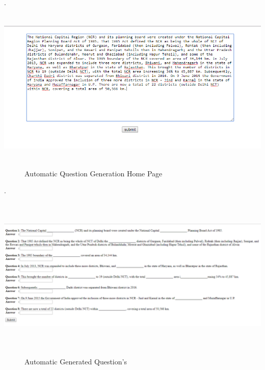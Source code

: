 \break
. \\[2.0cm]
\begin{center}
	\includegraphics[width=13.5cm, height=7.5cm]{aqg1.png}
	\begin{figure}[h!]
		\centering
		\caption{Automatic Question Generation Home Page}%
	\end{figure}
\end{center}
\break
. \\[2.0cm]
\begin{center}
	\includegraphics[width=13.5cm, height=7.5cm]{aqg2.png}
	\begin{figure}[h!]
		\centering
		\caption{Automatic Generated Question's }%
	\end{figure}
\end{center}
\break
